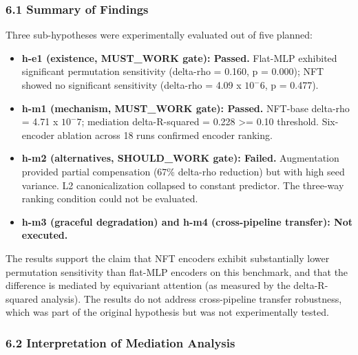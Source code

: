 
\subsubsection{6.1 Summary of Findings}

Three sub-hypotheses were experimentally evaluated out of five planned:

\begin{itemize}
\item \textbf{h-e1 (existence, MUST\_WORK gate): Passed.} Flat-MLP exhibited significant permutation sensitivity (delta-rho = 0.160, p = 0.000); NFT showed no significant sensitivity (delta-rho = 4.09 x $10^-6$, p = 0.477).
\end{itemize}

\begin{itemize}
\item \textbf{h-m1 (mechanism, MUST\_WORK gate): Passed.} NFT-base delta-rho = 4.71 x $10^-7$; mediation delta-R-squared = 0.228 >= 0.10 threshold. Six-encoder ablation across 18 runs confirmed encoder ranking.
\end{itemize}

\begin{itemize}
\item \textbf{h-m2 (alternatives, SHOULD\_WORK gate): Failed.} Augmentation provided partial compensation (67\% delta-rho reduction) but with high seed variance. L2 canonicalization collapsed to constant predictor. The three-way ranking condition could not be evaluated.
\end{itemize}

\begin{itemize}
\item \textbf{h-m3 (graceful degradation) and h-m4 (cross-pipeline transfer): Not executed.}
\end{itemize}

The results support the claim that NFT encoders exhibit substantially lower permutation sensitivity than flat-MLP encoders on this benchmark, and that the difference is mediated by equivariant attention (as measured by the delta-R-squared analysis). The results do not address cross-pipeline transfer robustness, which was part of the original hypothesis but was not experimentally tested.

\subsubsection{6.2 Interpretation of Mediation Analysis}


